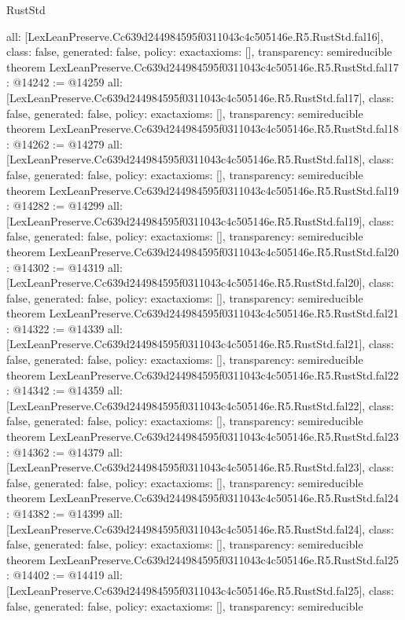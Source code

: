 \begin{lexlean}{RustStd}
\begin{coremodule}
{  all: [LexLeanPreserve.Cc639d244984595f0311043c4c505146e.R5.RustStd.fal16],
  class: false,
  generated: false,
  policy: exact{axioms: []},
  transparency: semireducible
}
theorem LexLeanPreserve.Cc639d244984595f0311043c4c505146e.R5.RustStd.fal17 : @14242 := @14259 {
  all: [LexLeanPreserve.Cc639d244984595f0311043c4c505146e.R5.RustStd.fal17],
  class: false,
  generated: false,
  policy: exact{axioms: []},
  transparency: semireducible
}
theorem LexLeanPreserve.Cc639d244984595f0311043c4c505146e.R5.RustStd.fal18 : @14262 := @14279 {
  all: [LexLeanPreserve.Cc639d244984595f0311043c4c505146e.R5.RustStd.fal18],
  class: false,
  generated: false,
  policy: exact{axioms: []},
  transparency: semireducible
}
theorem LexLeanPreserve.Cc639d244984595f0311043c4c505146e.R5.RustStd.fal19 : @14282 := @14299 {
  all: [LexLeanPreserve.Cc639d244984595f0311043c4c505146e.R5.RustStd.fal19],
  class: false,
  generated: false,
  policy: exact{axioms: []},
  transparency: semireducible
}
theorem LexLeanPreserve.Cc639d244984595f0311043c4c505146e.R5.RustStd.fal20 : @14302 := @14319 {
  all: [LexLeanPreserve.Cc639d244984595f0311043c4c505146e.R5.RustStd.fal20],
  class: false,
  generated: false,
  policy: exact{axioms: []},
  transparency: semireducible
}
theorem LexLeanPreserve.Cc639d244984595f0311043c4c505146e.R5.RustStd.fal21 : @14322 := @14339 {
  all: [LexLeanPreserve.Cc639d244984595f0311043c4c505146e.R5.RustStd.fal21],
  class: false,
  generated: false,
  policy: exact{axioms: []},
  transparency: semireducible
}
theorem LexLeanPreserve.Cc639d244984595f0311043c4c505146e.R5.RustStd.fal22 : @14342 := @14359 {
  all: [LexLeanPreserve.Cc639d244984595f0311043c4c505146e.R5.RustStd.fal22],
  class: false,
  generated: false,
  policy: exact{axioms: []},
  transparency: semireducible
}
theorem LexLeanPreserve.Cc639d244984595f0311043c4c505146e.R5.RustStd.fal23 : @14362 := @14379 {
  all: [LexLeanPreserve.Cc639d244984595f0311043c4c505146e.R5.RustStd.fal23],
  class: false,
  generated: false,
  policy: exact{axioms: []},
  transparency: semireducible
}
theorem LexLeanPreserve.Cc639d244984595f0311043c4c505146e.R5.RustStd.fal24 : @14382 := @14399 {
  all: [LexLeanPreserve.Cc639d244984595f0311043c4c505146e.R5.RustStd.fal24],
  class: false,
  generated: false,
  policy: exact{axioms: []},
  transparency: semireducible
}
theorem LexLeanPreserve.Cc639d244984595f0311043c4c505146e.R5.RustStd.fal25 : @14402 := @14419 {
  all: [LexLeanPreserve.Cc639d244984595f0311043c4c505146e.R5.RustStd.fal25],
  class: false,
  generated: false,
  policy: exact{axioms: []},
  transparency: semireducible
}
\end{coremodule}
\end{lexlean}
